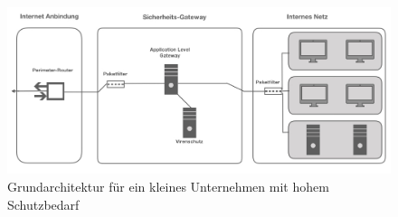 \begin{figure}
	\includegraphics[width= \linewidth]{klUnternehmnorm}
	\caption{Grundarchitektur für ein kleines Unternehmen mit hohem Schutzbedarf}
	\label{klUhoch}
\end{figure}